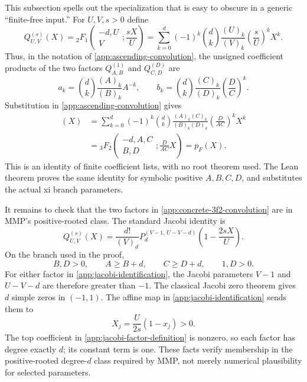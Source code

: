 This subsection spells out the specialization that is easy to obscure in a
generic ``finite-free input.''  For $U,V,s>0$ define
\begin{equation}\label{app:jacobi-factor-definition}
 Q_{U,V}^{(s)}(X)
 ={}_2F_1\!\left(\begin{matrix}-d,U\\V\end{matrix};\frac{sX}{U}\right)
 =\sum_{k=0}^d(-1)^k\binom dk
   \frac{(U)_k}{(V)_k}\left(\frac{s}{U}\right)^kX^k.
\end{equation}
Thus, in the notation of \eqref{app:ascending-convolution}, the unsigned
coefficient products of the two factors $Q_{A,B}^{(1)}$ and
$Q_{C,D}^{(D)}$ are
\[
 a_k=\binom dk\frac{(A)_k}{(B)_k}A^{-k},\qquad
 b_k=\binom dk\frac{(C)_k}{(D)_k}\left(\frac DC\right)^k.
\]
Substitution in \eqref{app:ascending-convolution} gives
\begin{align}
 [Q_{A,B}^{(1)}\boxconv Q_{C,D}^{(D)}](X)
 &=\sum_{k=0}^d(-1)^k\binom dk
   \frac{(A)_k(C)_k}{(B)_k(D)_k}
   \left(\frac{D}{AC}\right)^kX^k\nonumber\\
 &={}_3F_2\!\left(
   \begin{matrix}-d,A,C\\B,D\end{matrix};\frac{D}{AC}X\right)
 =p_F(X).                                      \label{app:concrete-3f2-convolution}
\end{align}
This is an identity of finite coefficient lists, with no root theorem used.
The Lean theorem
 proves the
same identity for symbolic positive $A,B,C,D$, and
 substitutes the actual
xi branch parameters.

It remains to check that the two factors in
\eqref{app:concrete-3f2-convolution} are in MMP's positive-rooted class.  The
standard Jacobi identity is
\begin{equation}\label{app:jacobi-identification}
 Q_{U,V}^{(s)}(X)
 =\frac{d!}{(V)_d}
 P_d^{(V-1,\,U-V-d)}\!\left(1-\frac{2sX}{U}\right).
\end{equation}
On the branch used in the proof,
\[
 B,D>0,\qquad A\ge B+d,\qquad C\ge D+d,
 \qquad 1,D>0.
\]
For either factor in \eqref{app:jacobi-identification}, the Jacobi parameters
$V-1$ and $U-V-d$ are therefore greater than $-1$.  The classical Jacobi
zero theorem gives $d$ simple zeros in $(-1,1)$.  The affine map in
\eqref{app:jacobi-identification} sends them to
\[
 X_j=\frac{U}{2s}(1-x_j)>0.
\]
The top coefficient in \eqref{app:jacobi-factor-definition} is nonzero, so
each factor has degree exactly $d$; its constant term is one.  These facts
verify membership in the positive-rooted degree-$d$ class required by MMP,
not merely numerical plausibility for selected parameters.

